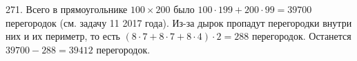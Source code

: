 271. Всего в прямоугольнике $100\times200$ было $100\cdot199+200\cdot99=39700$ перегородок (см. задачу 11 2017 года). Из-за дырок пропадут перегородки внутри них и их периметр, то есть $(8\cdot7+8\cdot7+8\cdot4)\cdot2=288$ перегородок. Останется $39700-288=39412$ перегородок.\\
